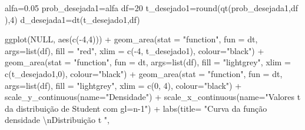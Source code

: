 \documentclass[
]{book}
\newenvironment{Shaded}{\begin{snugshade}}{\end{snugshade}}
\newcommand{\AttributeTok}[1]{\textcolor[rgb]{0.77,0.63,0.00}{#1}}
\newcommand{\ConstantTok}[1]{\textcolor[rgb]{0.00,0.00,0.00}{#1}}
\newcommand{\DecValTok}[1]{\textcolor[rgb]{0.00,0.00,0.81}{#1}}
\newcommand{\FloatTok}[1]{\textcolor[rgb]{0.00,0.00,0.81}{#1}}
\newcommand{\FunctionTok}[1]{\textcolor[rgb]{0.00,0.00,0.00}{#1}}
\newcommand{\NormalTok}[1]{#1}
\newcommand{\OtherTok}[1]{\textcolor[rgb]{0.56,0.35,0.01}{#1}}
\newcommand{\SpecialCharTok}[1]{\textcolor[rgb]{0.00,0.00,0.00}{#1}}
\newcommand{\StringTok}[1]{\textcolor[rgb]{0.31,0.60,0.02}{#1}}
\begin{document}
\begin{Shaded}
\begin{Highlighting}[]
\NormalTok{alfa}\OtherTok{=}\FloatTok{0.05}
\NormalTok{prob\_desejada1}\OtherTok{=}\NormalTok{alfa}
\NormalTok{df}\OtherTok{=}\DecValTok{20}
\NormalTok{t\_desejado1}\OtherTok{=}\FunctionTok{round}\NormalTok{(}\FunctionTok{qt}\NormalTok{(prob\_desejada1,df ),}\DecValTok{4}\NormalTok{)}
\NormalTok{d\_desejada1}\OtherTok{=}\FunctionTok{dt}\NormalTok{(t\_desejado1,df)}


\FunctionTok{ggplot}\NormalTok{(}\ConstantTok{NULL}\NormalTok{, }\FunctionTok{aes}\NormalTok{(}\FunctionTok{c}\NormalTok{(}\SpecialCharTok{{-}}\DecValTok{4}\NormalTok{,}\DecValTok{4}\NormalTok{))) }\SpecialCharTok{+}
  \FunctionTok{geom\_area}\NormalTok{(}\AttributeTok{stat =} \StringTok{"function"}\NormalTok{, }
            \AttributeTok{fun =}\NormalTok{ dt,}
            \AttributeTok{args=}\FunctionTok{list}\NormalTok{(df), }
            \AttributeTok{fill =} \StringTok{"red"}\NormalTok{, }
            \AttributeTok{xlim =} \FunctionTok{c}\NormalTok{(}\SpecialCharTok{{-}}\DecValTok{4}\NormalTok{, t\_desejado1),}
            \AttributeTok{colour=}\StringTok{"black"}\NormalTok{) }\SpecialCharTok{+}
  \FunctionTok{geom\_area}\NormalTok{(}\AttributeTok{stat =} \StringTok{"function"}\NormalTok{, }
            \AttributeTok{fun =}\NormalTok{ dt, }
            \AttributeTok{args=}\FunctionTok{list}\NormalTok{(df), }
            \AttributeTok{fill =} \StringTok{"lightgrey"}\NormalTok{, }
            \AttributeTok{xlim =} \FunctionTok{c}\NormalTok{(t\_desejado1,}\DecValTok{0}\NormalTok{),}
            \AttributeTok{colour=}\StringTok{"black"}\NormalTok{) }\SpecialCharTok{+}
  \FunctionTok{geom\_area}\NormalTok{(}\AttributeTok{stat =} \StringTok{"function"}\NormalTok{, }
            \AttributeTok{fun =}\NormalTok{ dt, }
            \AttributeTok{args=}\FunctionTok{list}\NormalTok{(df), }
            \AttributeTok{fill =} \StringTok{"lightgrey"}\NormalTok{, }
            \AttributeTok{xlim =} \FunctionTok{c}\NormalTok{(}\DecValTok{0}\NormalTok{, }\DecValTok{4}\NormalTok{),}
            \AttributeTok{colour=}\StringTok{"black"}\NormalTok{) }\SpecialCharTok{+}
  \FunctionTok{scale\_y\_continuous}\NormalTok{(}\AttributeTok{name=}\StringTok{"Densidade"}\NormalTok{) }\SpecialCharTok{+}
  \FunctionTok{scale\_x\_continuous}\NormalTok{(}\AttributeTok{name=}\StringTok{"Valores \textasciigrave{}\textasciigrave{}t\textquotesingle{}\textquotesingle{} da distribuição de Student com gl=n{-}1"}\NormalTok{)  }\SpecialCharTok{+}
  \FunctionTok{labs}\NormalTok{(}\AttributeTok{title=} \StringTok{"Curva da função densidade }\SpecialCharTok{\textbackslash{}n}\StringTok{Distribuição t "}\NormalTok{, }

\end{Highlighting}
\end{Shaded}
\end{document}
